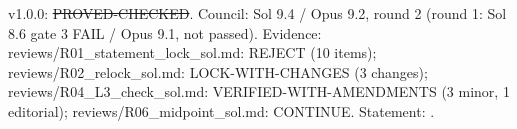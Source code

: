 \begin{theorem}\label{reg:W2-FAC-PK_Thm-PATH}
\end{theorem}
\begin{statusbox}
 v1.0.0: \st{PROVED-CHECKED}. Council: Sol 9.4 / Opus 9.2, round 2 (round 1: Sol 8.6 gate 3 FAIL / Opus 9.1, not passed). Evidence: reviews/R01\_statement\_lock\_sol.md: REJECT (10 items); reviews/R02\_relock\_sol.md: LOCK-WITH-CHANGES (3 changes); reviews/R04\_L3\_check\_sol.md: VERIFIED-WITH-AMENDMENTS (3 minor, 1 editorial); reviews/R06\_midpoint\_sol.md: CONTINUE. Statement: .
\end{statusbox}

